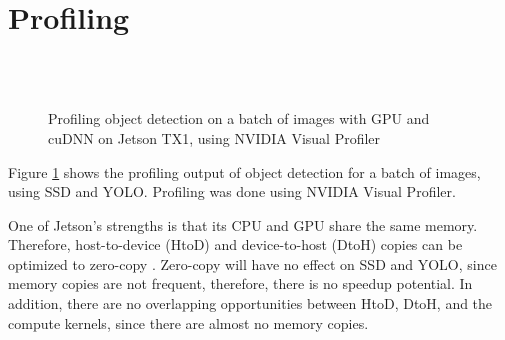 \section{Profiling}
\label{sec:profiling}

\begin{figure}[t]
  \begin{center}
     \\
     \\
    \caption{Profiling object detection on a batch of images with GPU and cuDNN on Jetson TX1, using NVIDIA Visual Profiler}
    \label{fig:profile}
  \end{center}
\end{figure}

Figure \ref{fig:profile} shows the profiling output of object detection for a batch of images, using SSD and YOLO. Profiling was done using NVIDIA Visual Profiler.

One of Jetson's strengths is that its CPU and GPU share the same memory. Therefore, host-to-device (HtoD) and device-to-host (DtoH) copies can be optimized to zero-copy \cite{tegrazerocopy}. Zero-copy will have no effect on SSD and YOLO, since memory copies are not frequent, therefore, there is no speedup potential. In addition, there are no overlapping opportunities between HtoD, DtoH, and the compute kernels, since there are almost no memory copies.

